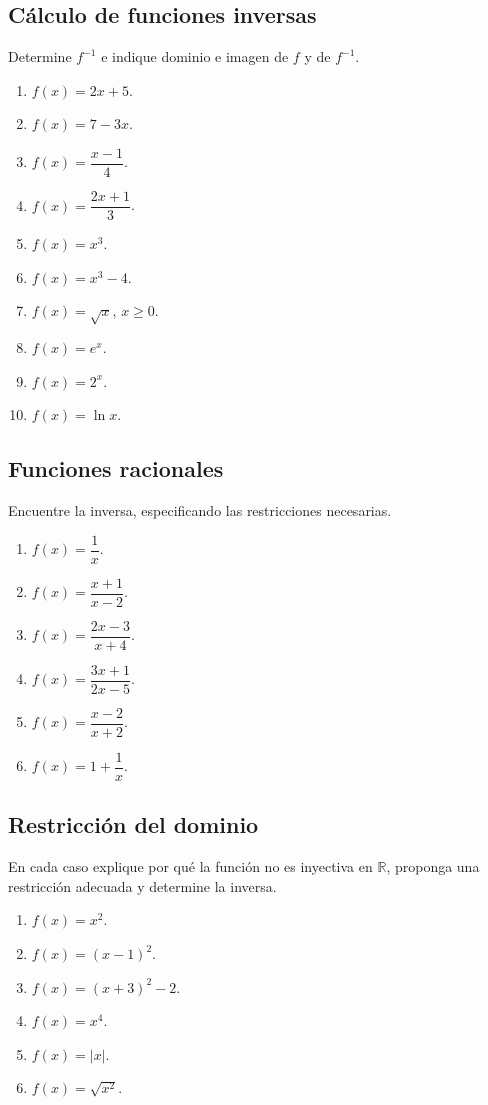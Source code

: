 \documentclass[12pt]{article}
\theoremstyle{remark}
\begin{document}
\subsection*{Cálculo de funciones inversas}
Determine $f^{-1}$ e indique dominio e imagen de $f$ y de $f^{-1}$.
\begin{enumerate}
\item $f(x)=2x+5$.
\item $f(x)=7-3x$.
\item $f(x)=\dfrac{x-1}{4}$.
\item $f(x)=\dfrac{2x+1}{3}$.
\item $f(x)=x^3$.
\item $f(x)=x^3-4$.
\item $f(x)=\sqrt{x}$, $x\ge0$.
\item $f(x)=e^x$.
\item $f(x)=2^x$.
\item $f(x)=\ln x$.
\end{enumerate}

\subsection*{Funciones racionales}
Encuentre la inversa, especificando las restricciones necesarias.
\begin{enumerate}
\item $f(x)=\dfrac1x$.
\item $f(x)=\dfrac{x+1}{x-2}$.
\item $f(x)=\dfrac{2x-3}{x+4}$.
\item $f(x)=\dfrac{3x+1}{2x-5}$.
\item $f(x)=\dfrac{x-2}{x+2}$.
\item $f(x)=1+\dfrac1x$.
\end{enumerate}

\subsection*{Restricción del dominio}
En cada caso explique por qué la función no es inyectiva en $\mathbb R$, proponga una restricción adecuada y determine la inversa.
\begin{enumerate}
\item $f(x)=x^2$.
\item $f(x)=(x-1)^2$.
\item $f(x)=(x+3)^2-2$.
\item $f(x)=x^4$.
\item $f(x)=|x|$.
\item $f(x)=\sqrt{x^2}$.
\end{enumerate}
\end{document}
